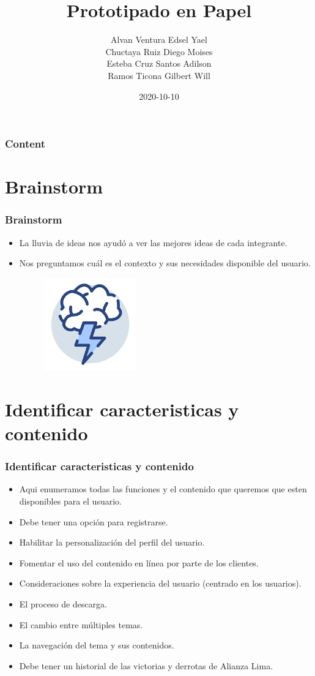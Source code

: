 \documentclass[11pt]{beamer}
\title[Prototipado en Papel]{\bf\Huge Prototipado en Papel}
\author[rescobedoq]
{
    Alvan Ventura Edsel Yael \inst{1}\\
	Chuctaya Ruiz Diego Moises \inst{2}\\
	Esteba Cruz Santos Adilson\inst{3}\\
	Ramos Ticona Gilbert Will\inst{4}
}
\institute[UNSA]
{
\inst{1}%
System Engineering School\\
}
\date[2020-10-10]{\scriptsize{2020-10-10}}
\begin{document}
\begin{frame}
\titlepage
\end{frame}

\begin{frame}
\frametitle{Content}
\tableofcontents
\end{frame}

\section{Brainstorm}
\begin{frame}
\frametitle{Brainstorm}
\begin{itemize}
 \item La lluvia de ideas nos ayudó a ver las mejores ideas de cada integrante.
 \item Nos preguntamos cuál es el contexto y sus necesidades disponible del usuario.

\begin{figure}[t]
\includegraphics[width=4cm, height=4cm]{lluvia.png}
\centering
\end{figure}
\end{itemize}
\end{frame}

\section{Identificar caracteristicas y contenido}
\begin{frame}
\frametitle{Identificar caracteristicas y contenido}
\begin{itemize}
\item  Aqui enumeramos todas las funciones y el contenido que queremos que esten disponibles para el usuario. 
\item  Debe tener una opción para registrarse.
\item  Habilitar la personalización del perfil del usuario.
\item  Fomentar el uso del contenido en línea por parte de los clientes.
\item  Consideraciones sobre la experiencia del usuario (centrado en los usuarios).
\item  El proceso de descarga.
\item  El cambio entre múltiples temas.
\item  La navegación del tema y sus contenidos.
\item  Debe tener un historial de las victorias y derrotas de Alianza Lima.

\end{itemize}
\end{frame}
\end{document}
